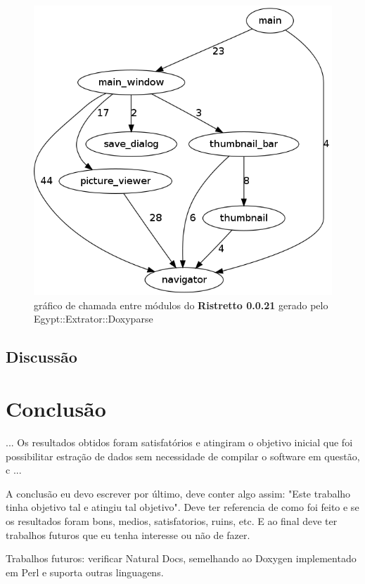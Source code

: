 \begin{figure}
\center
\includegraphics[scale=0.5]{imagens/ristretto-0_0_21-doxyparse-2}
\caption{gráfico de chamada entre módulos do {\bf Ristretto 0.0.21} gerado pelo Egypt::Extrator::Doxyparse}
\label{ristretto-0.0.21-doxyparse-2}
\end{figure}

\section{Discussão}

\chapter{Conclusão}

... Os resultados obtidos foram satisfatórios e atingiram o objetivo inicial que
foi possibilitar estração de dados sem necessidade de compilar o software em
questão, c ...

A conclusão eu devo escrever por último, deve conter algo assim: "Este trabalho
tinha objetivo tal e atingiu tal objetivo". Deve ter referencia de como foi
feito e se os resultados foram bons, medios, satisfatorios, ruins, etc. E ao
final deve ter trabalhos futuros que eu tenha interesse ou não de fazer.

Trabalhos futuros: verificar Natural Docs, semelhando ao Doxygen implementado
em Perl e suporta outras linguagens.
